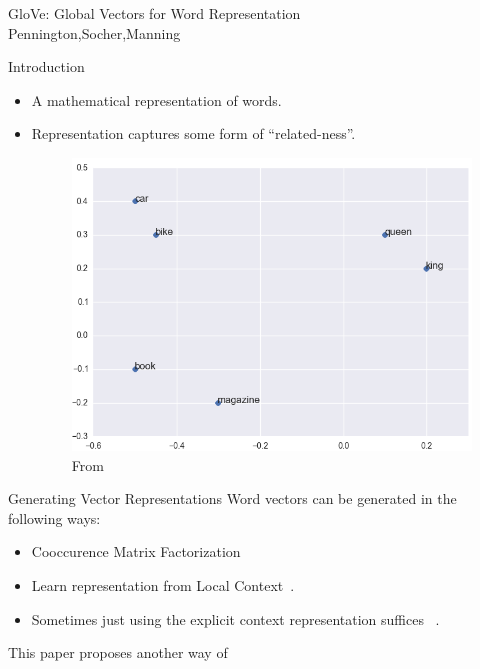 \begin{frame}
  \begin{center}
    {\huge GloVe: Global Vectors for Word Representation
    } \\
    Pennington,Socher,Manning
  \end{center}
\end{frame}

\begin{frame}{Introduction}
  \begin{itemize}
  \item A mathematical representation of words.
  \item Representation captures some form of ``related-ness''.
    \begin{figure}
      \includegraphics[scale=0.35]{images/wordvec.png}
      \caption{From}
    \end{figure}    
  \end{itemize}
\end{frame}

\begin{frame}{Generating Vector Representations}
  Word vectors can be generated in the following ways:
  \begin{itemize}
  \item Cooccurence Matrix Factorization~\cite{Deerwester} %
  \item Learn representation from Local Context~\cite{Mikolov13a}.%
  \item Sometimes just using the explicit context representation suffices ~\cite{Levy14}.
  \end{itemize}
  This paper proposes another way of 
\end{frame}

